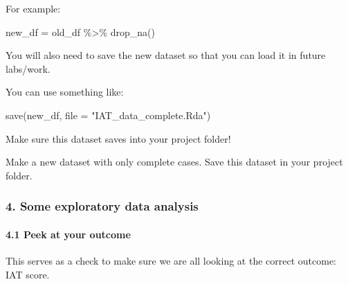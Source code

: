 \documentclass[
  letterpaper,
  DIV=11,
  numbers=noendperiod]{scrartcl}
\let\oldparagraph\paragraph
\renewcommand{\paragraph}[1]{\oldparagraph{#1}\mbox{}}
\newenvironment{Shaded}{\begin{snugshade}}{\end{snugshade}}
\newcommand{\AttributeTok}[1]{\textcolor[rgb]{0.40,0.45,0.13}{#1}}
\newcommand{\FunctionTok}[1]{\textcolor[rgb]{0.28,0.35,0.67}{#1}}
\newcommand{\NormalTok}[1]{\textcolor[rgb]{0.00,0.23,0.31}{#1}}
\newcommand{\OtherTok}[1]{\textcolor[rgb]{0.00,0.23,0.31}{#1}}
\newcommand{\SpecialCharTok}[1]{\textcolor[rgb]{0.37,0.37,0.37}{#1}}
\newcommand{\StringTok}[1]{\textcolor[rgb]{0.13,0.47,0.30}{#1}}
\begin{document}
For example:

\begin{Shaded}
\begin{Highlighting}[]
\NormalTok{new\_df }\OtherTok{=}\NormalTok{ old\_df }\SpecialCharTok{\%\textgreater{}\%} \FunctionTok{drop\_na}\NormalTok{()}
\end{Highlighting}
\end{Shaded}

You will also need to save the new dataset so that you can load it in
future labs/work.

You can use something like:

\begin{Shaded}
\begin{Highlighting}[]
\FunctionTok{save}\NormalTok{(new\_df, }\AttributeTok{file =} \StringTok{"IAT\_data\_complete.Rda"}\NormalTok{)}
\end{Highlighting}
\end{Shaded}

Make sure this dataset saves into your project folder!

\begin{tcolorbox}[enhanced jigsaw, left=2mm, opacitybacktitle=0.6, arc=.35mm, colback=white, colframe=quarto-callout-important-color-frame, bottomrule=.15mm, opacityback=0, toptitle=1mm, toprule=.15mm, titlerule=0mm, colbacktitle=quarto-callout-important-color!10!white, rightrule=.15mm, leftrule=.75mm, title=\textcolor{quarto-callout-important-color}{\faExclamation}\hspace{0.5em}{Task}, breakable, bottomtitle=1mm, coltitle=black]

Make a new dataset with only complete cases. Save this dataset in your
project folder.

\end{tcolorbox}

\hypertarget{some-exploratory-data-analysis}{%
\subsubsection{4. Some exploratory data
analysis}\label{some-exploratory-data-analysis}}

\hypertarget{peek-at-your-outcome}{%
\paragraph{4.1 Peek at your outcome}\label{peek-at-your-outcome}}

This serves as a check to make sure we are all looking at the correct
outcome: IAT score.
\end{document}
